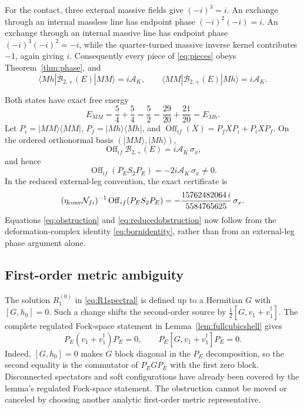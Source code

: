 \documentclass[11pt]{article}
\theoremstyle{definition}
\theoremstyle{remark}
\newcommand{\dg}{\dagger}
\newcommand{\AK}{\mathcal A_K}
\newcommand{\Born}{\mathcal B}
\begin{document}
For the contact, three external massive fields give $(-i)^3=i$.  An
exchange through an internal massless line has endpoint phase
$(-i)^2(-i)=i$.  An exchange through an internal massive line has
endpoint phase $(-i)^3(-i)^2=-i$, while the quarter-turned massive
inverse kernel contributes $-1$, again giving $i$.  Consequently every
piece of \eqref{eq:pieces} obeys Theorem~\ref{thm:phase}, and
\begin{equation}\label{eq:tplus}
\langle Mh|\Born_{2,+}(E)|MM\rangle=i\AK,
\qquad
\langle MM|\Born_{2,+}(E)|Mh\rangle=i\AK.
\end{equation}

Both states have exact free energy
\begin{equation}
E_{MM}=\frac54+\frac54=\frac52
=\frac{29}{20}+\frac{21}{20}=E_{Mh}.
\end{equation}
Let $P_i=|MM\rangle\langle MM|$, $P_f=|Mh\rangle\langle Mh|$, and
$\operatorname{Off}_{if}(X)=P_fXP_i+P_iXP_f$.  On the ordered
orthonormal basis $(|MM\rangle,|Mh\rangle)$,
\begin{equation}\label{eq:Tblock}
\operatorname{Off}_{if}\Born_{2,+}(E)=i\AK\,\sigma_x,
\end{equation}
and hence
\begin{equation}\label{eq:obstruction}
\boxed{
\operatorname{Off}_{if}(P_ES_2P_E)
=-2i\AK\,\sigma_x\ne0.}
\end{equation}
In the reduced external-leg convention, the exact certificate is
\begin{equation}\label{eq:reducedobstruction}
(\eta_{\rm conv}\mathcal N_{fi})^{-1}
\operatorname{Off}_{if}(P_ES_2P_E)
=-\frac{15762482064\,i}{5584765625}\,\sigma_x.
\end{equation}
Equations \eqref{eq:obstruction} and \eqref{eq:reducedobstruction} now
follow from the deformation-complex identity \eqref{eq:bornidentity},
rather than from an external-leg phase argument alone.

\subsection{First-order metric ambiguity}

The solution $R_1^{(0)}$ in \eqref{eq:R1spectral} is defined up to a
Hermitian $G$ with $[G,h_0]=0$.  Such a change shifts the second-order
source by $\tfrac12[G,v_1+v_1^{\dg}]$.  The complete regulated
Fock-space statement in Lemma~\ref{lem:fullcubicshell} gives
\begin{equation}\label{eq:ambiguity}
P_E(v_1+v_1^{\dg})P_E=0,
\qquad
P_E[G,v_1+v_1^{\dg}]P_E=0.
\end{equation}
Indeed, $[G,h_0]=0$ makes $G$ block diagonal in the $P_E$ decomposition,
so the second equality is the commutator of $P_EGP_E$ with the first
zero block.  Disconnected spectators and soft configurations have
already been covered by the lemma's regulated Fock-space statement.
The obstruction cannot be moved or canceled by choosing another analytic
first-order metric representative.
\end{document}
